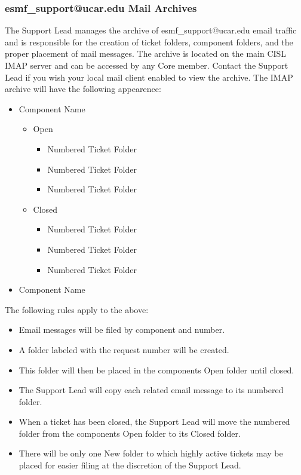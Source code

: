 \subsubsection{esmf\_support@ucar.edu Mail Archives}
The Support Lead manages the archive of esmf\_support@ucar.edu email traffic and is responsible for the creation of ticket folders, component folders, and the proper placement of mail messages. The archive is located on the main CISL IMAP server and can be accessed by any Core member.  Contact the Support Lead if you wish your local mail client enabled to view the archive.  The IMAP archive will have the following appearence:
\begin{itemize}
\item{Component Name}
  \begin{itemize}
    \item{Open}
      \begin{itemize}
        \item{Numbered Ticket Folder}
        \item{Numbered Ticket Folder}
        \item{Numbered Ticket Folder}
      \end{itemize}
    \item{Closed}
      \begin{itemize}
        \item{Numbered Ticket Folder}
        \item{Numbered Ticket Folder}
        \item{Numbered Ticket Folder}
      \end{itemize}
    \end{itemize}
\item{Component Name}
\end{itemize}

The following rules apply to the above:

\begin{itemize}
\item Email messages will be filed by component and number. 
\item A folder labeled with the request number will be created. 
\item This folder will then be placed in the components Open folder until closed.  
\item The Support Lead will copy each related email message to its numbered folder. 
\item When a ticket has been closed, the Support Lead will move the numbered folder from the components Open folder to its Closed folder.
\item There will be only one New folder to which highly active tickets may be placed 
for easier filing at the discretion of the Support Lead. 
\end{itemize}

